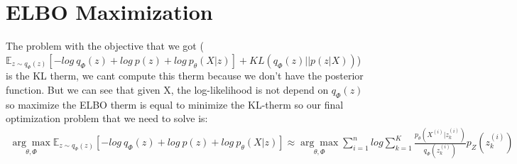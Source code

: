 \section*{ELBO Maximization}
The problem with the objective that we got ($\mathbb{E}_{z \sim q_{\Phi}(z)}[-log \ q_{\Phi}(z) + log \ p(z) + log \ p_{\theta}(X|z)]+KL(q_{\Phi}(z)||p(z|X))$) is the KL therm, we cant compute this therm because we don't have the posterior function. But we can see that given X, the log-likelihood is not depend on $q_{\Phi}(z)$ so maximize the ELBO therm is equal to minimize the KL-therm so our final optimization problem that we need to solve is: 
\begin{gather*}
\underset{\theta, \Phi}{\arg\max} \mathbb{E}_{z \sim q_{\Phi}(z)}[-log \ q_{\Phi}(z) + log \ p(z) + log \ p_{\theta}(X|z)] \approx \underset{\theta, \Phi}{\arg\max} \sum_{i=1}^{n}log \sum_{k=1}^{K}\frac{p_{\theta}(X^{(i)}|z_{k}^{(i)})}{q_{\Phi}(z_{k}^{(i)})}p_{Z}(z_{k}^{(i)})\\
\end{gather*}
